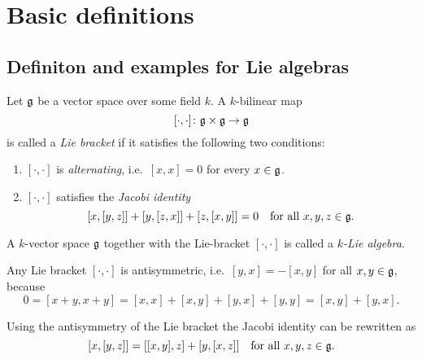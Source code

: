 \section{Basic definitions}





\subsection{Definiton and examples for Lie algebras}


\begin{defi}
 Let $\mathfrak{g}$ be a vector space over some field $k$. A $k$-bilinear map
 \[
  [\cdot, \cdot] \colon \mathfrak{g} \times \mathfrak{g} \to \mathfrak{g}
 \]
 is called a \emph{Lie bracket} if it satisfies the following two conditions:
 \begin{enumerate}
  \item
   $[\cdot, \cdot]$ is \emph{alternating}, i.e.\ $[x,x] = 0$ for every $x \in \mathfrak{g}$.
  \item
   $[\cdot, \cdot]$ satisfies the \emph{Jacobi identity}
   \[
    [x,[y,z]] + [y,[z,x]] + [z,[x,y]] = 0
    \quad
    \text{for all $x,y,z \in \mathfrak{g}$}.
   \]
 \end{enumerate}
 A $k$-vector space $\mathfrak{g}$ together with the Lie-bracket $[\cdot,\cdot]$ is called a \emph{$k$-Lie algebra}.
\end{defi}


\begin{rem}
 Any Lie bracket $[\cdot, \cdot]$ is antisymmetric, i.e.\ $[y,x] = -[x,y]$ for all $x,y \in \mathfrak{g}$, because
 \[
  0 = [x+y, x+y] = [x,x] + [x,y] + [y,x] + [y,y] = [x,y] + [y,x].
 \]
\end{rem}


\begin{rem}
 Using the antisymmetry of the Lie bracket the Jacobi identity can be rewritten as
 \[
  [x,[y,z]] = [[x,y],z] + [y,[x,z]] \quad \text{for all $x,y,z \in \mathfrak{g}$}.
 \]
\end{rem}



